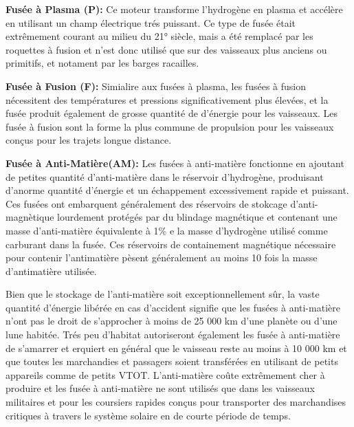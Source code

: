\textbf{Fusée à Plasma (P):} Ce moteur transforme l'hydrogène en plasma et accélère en utilisant un champ électrique trés puissant. Ce type de fusée était extrêmement courant au milieu du 21° siècle, mais a été remplacé par les roquettes à fusion et n'est donc utilisé que sur des vaisseaux plus anciens ou primitifs, et notament par les barges racailles. 

\textbf{Fusée à Fusion (F):} Simialire aux fusées à plasma, les fusées à fusion nécessitent des températures et pressions significativement plus élevées, et la fusée produit également de grosse quantité de d'énergie pour les vaisseaux. Les fusée à fusion sont la forme la plus commune de propulsion pour les vaisseaux conçus pour les trajets longue distance. 

\textbf{Fusée à Anti-Matière(AM):} Les fusées à anti-matière fonctionne en ajoutant de petites quantité d'anti-matière dans le réservoir d'hydrogène, produisant d'anorme quantité d'énergie et un échappement excessivement rapide et puissant. Ces fusées ont embarquent généralement des réservoirs de stokcage d'anti-magnètique lourdement protégés par du blindage magnétique et contenant une masse d'anti-matière équivalente à 1\% e la masse d'hydrogène utilisé comme carburant dans la fusée. Ces réservoirs de containement magnétique nécessaire pour contenir l'antimatière pèsent généralement au moins 10 fois la masse d'antimatière utilisée. 

Bien que le stockage de l'anti-matière soit exceptionnellement sûr, la vaste quantité d'énergie libérée en cas d'accident signifie que les fusées à anti-matière n'ont pas le droit de s'approcher à moins de 25 000 km d'une planète ou d'une lune habitée. Trés peu d'habitat autoriseront également les fusée à anti-matière de s'amarrer et erquiert en général que le vaisseau reste au moins à 10 000 km et que toutes les marchandies et passagers soient transférées en utilisant de petits appareils comme de petits VTOT. L'anti-matière coûte extrêmement cher à produire et les fusée à anti-matière ne sont utilisés que dans les vaisseaux militaires et pour les coursiers rapides conçus pour transporter des marchandises critiques à travers le système solaire en de courte période de temps. 


